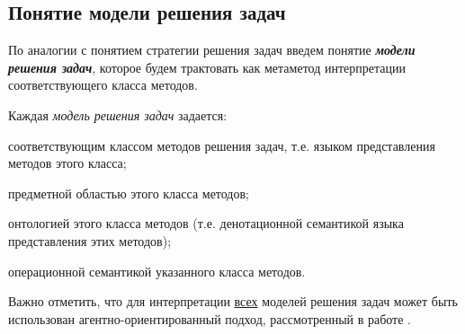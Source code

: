 \subsection{Понятие модели решения задач}
\label{sec_problem_solving_model}

По аналогии с понятием стратегии решения задач введем понятие \textbf{\textit{модели решения задач}}, которое будем трактовать как метаметод интерпретации соответствующего класса методов.

\begin{SCn}
	\begin{scnindent}
	\end{scnindent}
\end{SCn}

Каждая \textit{модель решения задач} задается:
\begin{textitemize}
	\item соответствующим классом методов решения задач, т.е. языком представления методов этого класса;
	\item предметной областью этого класса методов;
	\item онтологией этого класса методов (т.е. денотационной семантикой языка представления этих методов);
	\item операционной семантикой указанного класса методов.
\end{textitemize}

Важно отметить, что для интерпретации \underline{всех} моделей решения задач может быть использован агентно-ориентированный подход, рассмотренный в работе \cite{Shunkevich2018}.

